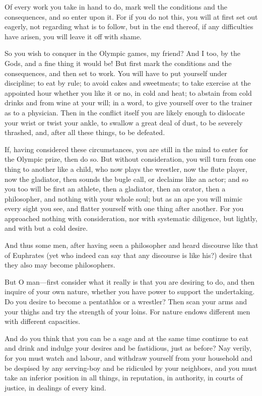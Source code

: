 Of  every work  you  take in  hand  to do,  mark well  the  conditions and  the
consequences, and so enter  upon it. For if you do not this,  you will at first
set out eagerly,  not regarding what is  to follow, but in the  end thereof, if
any difficulties have arisen, you will leave it off with shame.

So you wish to conquer in the Olympic games, my friend? And I too, by the Gods,
and  a  fine  thing  it  would  be! But  first  mark  the  conditions  and  the
consequences,  and then  set  to work.  You  will have  to  put yourself  under
discipline; to eat by rule; to avoid  cakes and sweetmeats; to take exercise at
the appointed hour whether you like it or no, in cold and heat; to abstain from
cold drinks and from wine at your will; in a word, to give yourself over to the
trainer as to a physician. Then in the conflict itself you are likely enough to
dislocate your wrist or  twist your ankle, to swallow a great  deal of dust, to
be severely thrashed, and, after all these things, to be defeated.

If, having considered  these circumstances, you are still in  the mind to enter
for the  Olympic prize, then  do so. But  without consideration, you  will turn
from one  thing to another like  a child, who  now plays the wrestler,  now the
flute player, now  the gladiator, then sounds the bugle  call, or declaims like
an actor; and  so you too will be  first an athlete, then a  gladiator, then an
orator, then a philosopher, and nothing with your whole soul; but as an ape you
will  mimic every  sight you  see, and  flatter yourself  with one  thing after
another. For  you approached  nothing with  consideration, nor  with systematic
diligence, but lightly, and with but a cold desire.

And thus  some men, after  having seen a  philosopher and heard  discourse like
that of  Euphrates (yet  who indeed can  say that any  discourse is  like his?)
desire that they also may become philosophers.

But O man---first consider  what it really is that you are  desiring to do, and
then  inquire  of your  own  nature,  whether you  have  power  to support  the
undertaking. Do you desire to become a pentathlos or a wrestler? Then scan your
arms and  your thighs  and try the  strength of your  loins. For  nature endows
different men with different capacities.

And do you  think that you can be a  sage and at the same time  continue to eat
and  drink and  indulge your  desires and  be fastidious,  just as  before? Nay
verily,  for  you must  watch  and  labour,  and  withdraw yourself  from  your
household  and  be  despised  by  any serving-boy  and  be  ridiculed  by  your
neighbors, and you must take an inferior position in all things, in reputation,
in authority, in courts of justice, in dealings of every kind.

